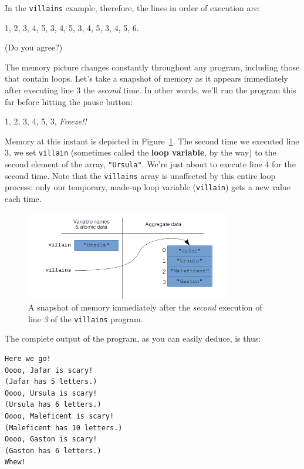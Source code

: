 In the \texttt{villains} example, therefore, the lines in order of execution
are:

\begin{center}
1, 2, 3, 4, 5, 3, 4, 5, 3, 4, 5, 3, 4, 5, 6.
\end{center}

(Do you agree?)

The memory picture changes constantly throughout any program, including those
that contain loops. Let's take a snapshot of memory as it appears immediately
after executing line 3 the \textit{second} time. In other words, we'll run the
program this far before hitting the pause button:

\begin{center}
1, 2, 3, 4, 5, 3, \textit{Freeze!!}
\end{center}


Memory at this instant is depicted in Figure~\ref{fig:loopsMemory}. The second
time we executed line 3, we set \texttt{villain} (sometimes called the
\textbf{loop variable}, by the way) to the second element of the array,
\texttt{"Ursula"}. We're just about to execute line 4 for the second time. Note
that the \texttt{villains} array is unaffected by this entire loop process:
only our temporary, made-up loop variable (\texttt{villain}) gets a new value
each time.

\begin{figure}[ht]
\centering
\includegraphics[width=0.8\textwidth]{loopsMemory.png}
\caption{A snapshot of memory immediately after the \textit{second} execution
of line \textit{3} of the \texttt{villains} program.}
\label{fig:loopsMemory}
\end{figure}

The complete output of the program, as you can easily deduce, is thus:

\begin{Verbatim}[fontsize=\small,samepage=true,frame=leftline,framesep=5mm,framerule=1mm]
Here we go!
Oooo, Jafar is scary!
(Jafar has 5 letters.)
Oooo, Ursula is scary!
(Ursula has 6 letters.)
Oooo, Maleficent is scary!
(Maleficent has 10 letters.)
Oooo, Gaston is scary!
(Gaston has 6 letters.)
Whew!
\end{Verbatim}

